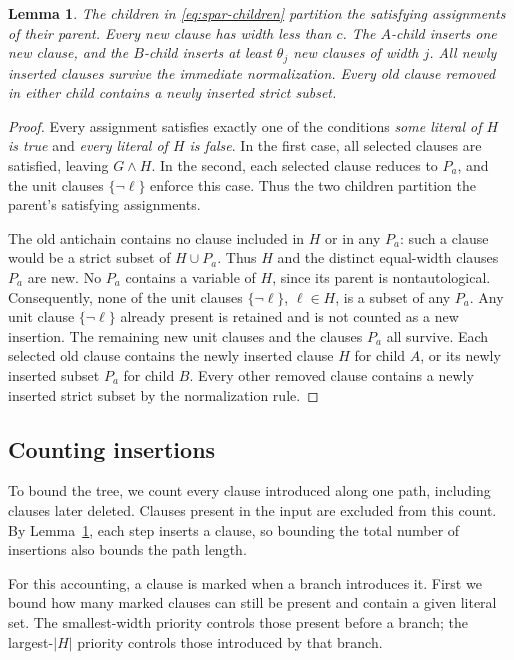 \documentclass[11pt,reqno]{amsart}
\numberwithin{equation}{section}
\newtheorem{lemma}[theorem]{Lemma}
\theoremstyle{definition}\newtheorem{definition}[theorem]{Definition}
\theoremstyle{remark}\newtheorem{remark}[theorem]{Remark}
\begin{document}
\begin{lemma}\label{lem:spar-branch}
The children in \eqref{eq:spar-children} partition the satisfying
assignments of their parent. Every new clause has width less than $c$.
The $A$-child inserts one new clause, and the $B$-child inserts at least
$\theta_j$ new clauses of width $j$. All newly inserted clauses survive
the immediate normalization. Every old clause removed in either child
contains a newly inserted strict subset.
\end{lemma}
\begin{proof}
Every assignment satisfies exactly one of the conditions
\emph{some literal of $H$ is true} and
\emph{every literal of $H$ is false}.
In the first case, all selected clauses are satisfied, leaving
$G\wedge H$. In the second, each selected clause reduces to $P_a$,
and the unit clauses $\{\neg\ell\}$ enforce this case.
Thus the two children partition the parent's satisfying assignments.

The old antichain contains no clause included in $H$ or in any $P_a$:
such a clause would be a strict subset of $H\cup P_a$.
Thus $H$ and the distinct equal-width clauses $P_a$ are new.
No $P_a$ contains a variable of $H$, since its parent is nontautological.
Consequently, none of the unit clauses $\{\neg\ell\}$, $\ell\in H$,
is a subset of any $P_a$.
Any unit clause $\{\neg\ell\}$ already present is retained and
is not counted as a new insertion.
The remaining new unit clauses and the clauses $P_a$ all survive.
Each selected old clause contains the newly inserted clause $H$
for child $A$, or its newly inserted subset $P_a$ for child $B$.
Every other removed clause contains a newly inserted strict subset
by the normalization rule.
\end{proof}

\subsection{Counting insertions}
To bound the tree, we count every clause introduced along one path,
including clauses later deleted. Clauses present in the input are
excluded from this count. By Lemma~\ref{lem:spar-branch}, each step
inserts a clause, so bounding the total number of insertions also
bounds the path length.

For this accounting, a clause is marked when a branch introduces it.
First we bound how many
marked clauses can still be present and contain a given literal set.
The smallest-width priority controls those present before a branch;
the largest-$|H|$ priority controls those introduced by that branch.
\end{document}
